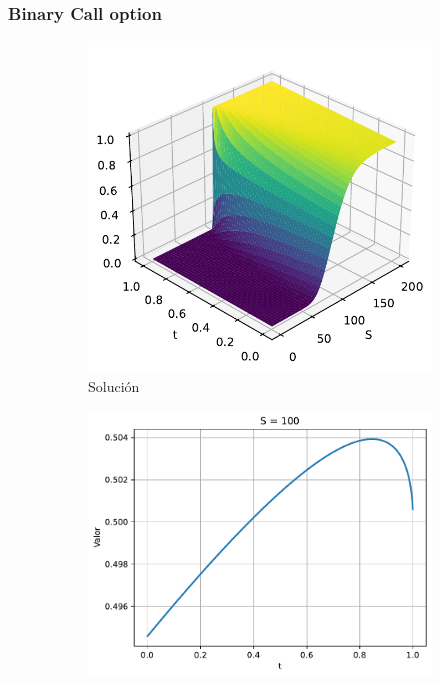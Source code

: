 \subsubsection{Binary Call option}
\begin{figure}[H]
    \centering
    \begin{subfigure}[b]{0.3\linewidth}
        \includegraphics[width=\linewidth]{Imagenes/Parte1/6_Sols/Binary_Call/BinaryCall3D.pdf}
        \caption{Solución}
    \end{subfigure}
    \begin{subfigure}[b]{0.3\linewidth}
        \includegraphics[width=\linewidth]{Imagenes/Parte1/6_Sols/Binary_Call/BinaryCallSFijo.pdf}

\end{subfigure}
\end{figure}
